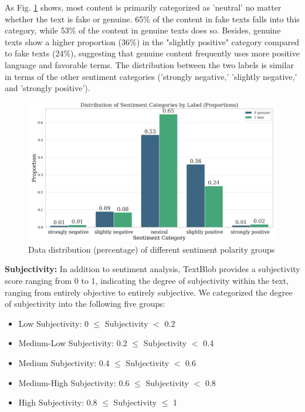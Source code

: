 As Fig. \ref {fig:sentiment} shows, most content is primarily categorized as 'neutral' no matter whether the text is fake or genuine. 65\% of the content in fake texts falls into this category, while 53\% of the content in genuine texts does so. Besides, genuine texts show a higher proportion (36\%) in the "slightly positive" category compared to fake texts (24\%), suggesting that genuine content frequently uses more positive language and favorable terms. The distribution between the two labels is similar in terms of the other sentiment categories ('strongly negative,' 'slightly negative,' and 'strongly positive').\\

\begin{figure}
    \centering
    \includegraphics[width=1\linewidth]{img/Sentiment.png}
    \caption{Data distribution (percentage) of different sentiment polarity groups}
    \label{fig:sentiment}
\end{figure}

\textbf{Subjectivity:}
In addition to sentiment analysis, TextBlob provides a subjectivity score ranging from 0 to 1, indicating the degree of subjectivity within the text, ranging from entirely objective to entirely subjective. We categorized the degree of subjectivity into the following five groups:

\begin{itemize}
\item Low Subjectivity: 0 $\leq$ Subjectivity $<$ 0.2
\item Medium-Low Subjectivity: 0.2 $\leq$ Subjectivity $<$ 0.4
\item Medium Subjectivity: 0.4 $\leq$ Subjectivity $<$ 0.6
\item Medium-High Subjectivity: 0.6 $\leq$ Subjectivity $<$ 0.8
\item High Subjectivity: 0.8 $\leq$ Subjectivity $\leq$ 1
\end{itemize}

